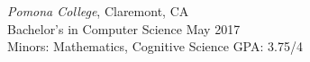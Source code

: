 {\sl Pomona College}, Claremont, CA \\
Bachelor's in Computer Science \hfill May 2017 \\
Minors: Mathematics, Cognitive Science \hfill GPA: 3.75/4

